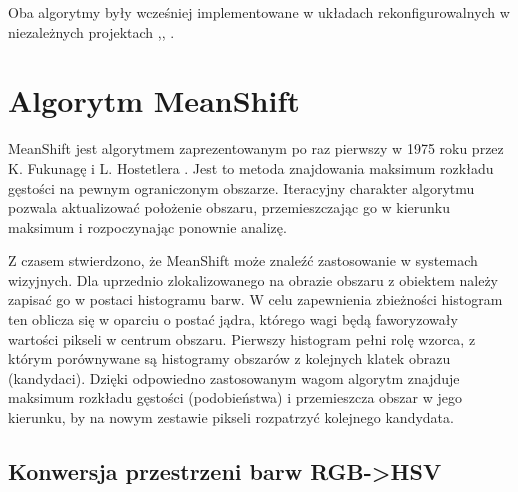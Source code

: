 Oba algorytmy były wcześniej implementowane w układach rekonfigurowalnych w niezależnych projektach \cite{Mazur},\cite{Patel}, \cite{Drozdz}.

\section{Algorytm MeanShift}

MeanShift jest algorytmem zaprezentowanym po raz pierwszy w 1975 roku przez K. Fukunagę i L. Hostetlera \cite{Fukunaga}. Jest to metoda znajdowania maksimum rozkładu gęstości na pewnym ograniczonym obszarze. Iteracyjny charakter algorytmu pozwala aktualizować położenie obszaru, przemieszczając go w kierunku maksimum i rozpoczynając ponownie analizę.

Z czasem stwierdzono, że MeanShift może znaleźć zastosowanie w systemach wizyjnych. Dla uprzednio zlokalizowanego na obrazie obszaru z obiektem należy zapisać go w postaci histogramu barw. W celu zapewnienia zbieżności histogram ten oblicza się w oparciu o postać jądra, którego wagi będą faworyzowały wartości pikseli w centrum obszaru. Pierwszy histogram pełni rolę wzorca, z którym porównywane są histogramy obszarów z kolejnych klatek obrazu (kandydaci). Dzięki odpowiedno zastosowanym wagom algorytm znajduje maksimum rozkładu gęstości (podobieństwa) i przemieszcza obszar w jego kierunku, by na nowym zestawie pikseli rozpatrzyć kolejnego kandydata.

\subsection{Konwersja przestrzeni barw RGB->HSV}
\label{sec:rgb2hsv} %


